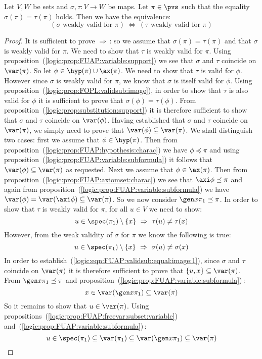 \begin{prop}\label{logic:prop:FUAP:validsub:equal:image}
Let $V,W$ be sets and $\sigma,\tau:V\to W$ be maps. Let $\pi\in\pvs$
such that the equality $\sigma(\pi)=\tau(\pi)$ holds. Then we have
the equivalence:
    \[
    (\mbox{$\sigma$ weakly valid for $\pi$})\ \Leftrightarrow\
    (\mbox{$\tau$ weakly valid for $\pi$})
    \]
\end{prop}
\begin{proof}
It is sufficient to prove $\Rightarrow$\,: so we assume that
$\sigma(\pi)=\tau(\pi)$ and that $\sigma$ is weakly valid for $\pi$.
We need to show that $\tau$ is weakly valid for $\pi$. Using
proposition~(\ref{logic:prop:FUAP:variable:support}) we see that
$\sigma$ and $\tau$ coincide on $\var(\pi)$. So let
$\phi\in\hyp(\pi)\cup\ax(\pi)$. We need to show that $\tau$ is valid
for $\phi$. However since $\sigma$ is weakly valid for $\pi$, we
know that $\sigma$ is itself valid for $\phi$. Using
proposition~(\ref{logic:prop:FOPL:validsub:image}), in order to show
that $\tau$ is also valid for $\phi$ it is sufficient to prove that
$\sigma(\phi)=\tau(\phi)$. From
proposition~(\ref{logic:prop:substitution:support}) it is therefore
sufficient to show that $\sigma$ and $\tau$ coincide on
$\var(\phi)$. Having established that $\sigma$ and $\tau$ coincide
on $\var(\pi)$, we simply need to prove that
$\var(\phi)\subseteq\var(\pi)$. We shall distinguish two cases:
first we assume that $\phi\in\hyp(\pi)$. Then from
proposition~(\ref{logic:prop:FUAP:hypothesis:charac}) we have
$\phi\preceq\pi$ and using
proposition~(\ref{logic:prop:FUAP:variable:subformula}) it follows
that $\var(\phi)\subseteq\var(\pi)$ as requested. Next we assume
that $\phi\in\ax(\pi)$. Then from
proposition~(\ref{logic:prop:FUAP:axiomset:charac}) we see that
$\axi\phi\preceq\pi$ and again from
proposition~(\ref{logic:prop:FUAP:variable:subformula}) we have
$\var(\phi)=\var(\axi\phi)\subseteq\var(\pi)$. So we now consider
$\gen x\pi_{1}\preceq\pi$. In order to show that $\tau$ is weakly
valid for $\pi$, for all $u\in V$ we need to show:
    \begin{equation}\label{logic:eqn:FUAP:validsub:equal:image:1}
    u\in\spec(\pi_{1})\setminus\{x\}\ \Rightarrow\
    \tau(u)\neq\tau(x)
    \end{equation}
However, from the weak validity of $\sigma$ for $\pi$ we know the
following is true:
    \begin{equation}\label{logic:eqn:FUAP:validsub:equal:image:2}
    u\in\spec(\pi_{1})\setminus\{x\}\ \Rightarrow\
    \sigma(u)\neq\sigma(x)
    \end{equation}
In order to establish~(\ref{logic:eqn:FUAP:validsub:equal:image:1}),
since $\sigma$ and $\tau$ coincide on $\var(\pi)$ it is therefore
sufficient to prove that $\{u,x\}\subseteq\var(\pi)$. From $\gen
x\pi_{1}\preceq\pi$ and
proposition~(\ref{logic:prop:FUAP:variable:subformula})\,:
    \[
    x\in\var(\gen x\pi_{1})\subseteq\var(\pi)
    \]
So it remains to show that $u\in\var(\pi)$. Using
propositions~(\ref{logic:prop:FUAP:freevar:subset:variable})
and~(\ref{logic:prop:FUAP:variable:subformula})\,:
    \[
    u\in\spec(\pi_{1})\subseteq\var(\pi_{1})\subseteq \var(\gen x\pi_{1})\subseteq\var(\pi)
    \]
\end{proof}
